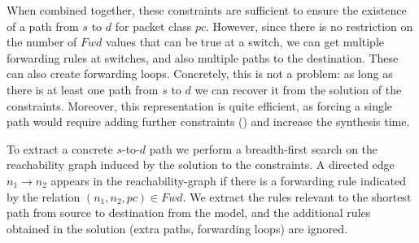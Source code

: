 When combined together, these constraints %
are sufficient to ensure the existence of a path from $s$ to $d$ for packet class $pc$.
However, since there is no restriction on the number of $Fwd$ values that can be true at a switch, we can get multiple forwarding rules at switches, and 
also multiple paths to the destination. 
These can also create forwarding loops. 
Concretely, this is not a problem: as long as there is  at least one path from $s$ to $d$ we can recover it from the solution of the constraints. 
Moreover, this representation is quite efficient, as forcing a single path would
require adding further constraints () and increase the synthesis
time.

To extract a concrete $s$-to-$d$ path we 
perform a breadth-first search on the reachability graph induced by the solution to the constraints. 
A directed edge $n_1 \rightarrow n_2$ appears in the reachability-graph if there is a 
forwarding rule indicated by the relation $(n_1,n_2, pc) \in Fwd$. 
We extract the rules relevant to the shortest path from source to destination from the model, and the additional rules obtained in the solution (extra paths, forwarding loops) are ignored.  

